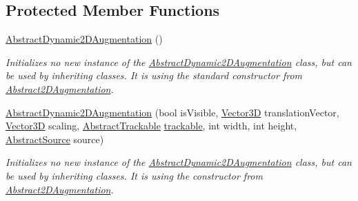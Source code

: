 \subsection*{Protected Member Functions}
\begin{DoxyCompactItemize}
\item 
\hyperlink{class_a_rdev_kit_1_1_model_1_1_project_1_1_abstract_dynamic2_d_augmentation_aacdc5a86b00f5fdf9e86ca8060c8b5e1}{Abstract\-Dynamic2\-D\-Augmentation} ()
\begin{DoxyCompactList}\small\item\em Initializes no new instance of the \hyperlink{class_a_rdev_kit_1_1_model_1_1_project_1_1_abstract_dynamic2_d_augmentation}{Abstract\-Dynamic2\-D\-Augmentation} class, but can be used by inheriting classes. It is using the standard constructor from \hyperlink{class_a_rdev_kit_1_1_model_1_1_project_1_1_abstract2_d_augmentation}{Abstract2\-D\-Augmentation}. \end{DoxyCompactList}\item 
\hyperlink{class_a_rdev_kit_1_1_model_1_1_project_1_1_abstract_dynamic2_d_augmentation_ab0861137122d08818a2df5c6e787e848}{Abstract\-Dynamic2\-D\-Augmentation} (bool is\-Visible, \hyperlink{class_a_rdev_kit_1_1_model_1_1_project_1_1_vector3_d}{Vector3\-D} translation\-Vector, \hyperlink{class_a_rdev_kit_1_1_model_1_1_project_1_1_vector3_d}{Vector3\-D} scaling, \hyperlink{class_a_rdev_kit_1_1_model_1_1_project_1_1_abstract_trackable}{Abstract\-Trackable} \hyperlink{class_a_rdev_kit_1_1_model_1_1_project_1_1_abstract_augmentation_a8d8e3f3c42696008edbfc44d51ba518d}{trackable}, int width, int height, \hyperlink{class_a_rdev_kit_1_1_model_1_1_project_1_1_abstract_source}{Abstract\-Source} source)
\begin{DoxyCompactList}\small\item\em Initializes no new instance of the \hyperlink{class_a_rdev_kit_1_1_model_1_1_project_1_1_abstract_dynamic2_d_augmentation}{Abstract\-Dynamic2\-D\-Augmentation} class, but can be used by inheriting classes. It is using the constructor from \hyperlink{class_a_rdev_kit_1_1_model_1_1_project_1_1_abstract2_d_augmentation}{Abstract2\-D\-Augmentation}. \end{DoxyCompactList}\end{DoxyCompactItemize}
